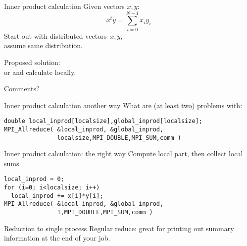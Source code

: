 \begin{numberedframe}{Inner product calculation}
  Given vectors $x,y$:
  \[ x^ty = \sum_{i=0}^{N-1} x_iy_i \]
  Start out with distributed vectors~$x,y$,\\
  assume same distribution.

  Proposed solution:\\
   or 
  and calculate locally.

  Comments?
\end{numberedframe}

\begin{numberedframe}{Inner product calculation another way}
  What are (at least two) problems with:
\begin{lstlisting}
double local_inprod[localsize],global_inprod[localsize];
MPI_Allreduce( &local_inprod, &global_inprod, 
               localsize,MPI_DOUBLE,MPI_SUM,comm )
\end{lstlisting}
\end{numberedframe}

\begin{numberedframe}{Inner product calculation: the right way}
  Compute local part, then collect local sums.

\lstset{language=C}
\begin{lstlisting}
local_inprod = 0;
for (i=0; i<localsize; i++)
  local_inprod += x[i]*y[i];
MPI_Allreduce( &local_inprod, &global_inprod, 
               1,MPI_DOUBLE,MPI_SUM,comm )
\end{lstlisting}
\end{numberedframe}

\begin{comment}
  \begin{optexerciseframe}
    
  \end{optexerciseframe}
\end{comment}

\begin{numberedframe}{Reduction to single process}
    Regular reduce: great for printing out summary information at the
  end of your job.
\end{numberedframe}

